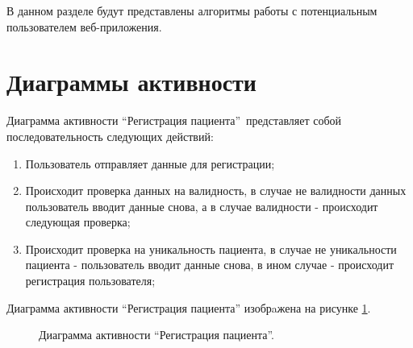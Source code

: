 \documentclass[14pt]{extreport}
\begin{document}
    В данном разделе будут представлены алгоритмы работы с потенциальным пользователем %
    веб-приложения.

    \section{Диаграммы активности}
        Диаграмма активности  “Регистрация пациента”\ представляет %
        собой последовательность следующих действий:
        \begin{enumerate}
            \item Пользователь отправляет данные для регистрации;
            \item Происходит проверка данных на валидность, в случае не %
            валидности данных пользователь вводит данные снова, а в %
            случае валидности - происходит следующая проверка;
            \item Происходит проверка на уникальность пациента, в %
            случае не уникальности пациента - пользователь вводит данные %
            снова, в ином случае - происходит регистрация пользователя;
        \end{enumerate}

        Диаграмма активности “Регистрация пациента” изобрaжена на рисунке \ref{diagram-registration}.
        \begin{figure}[H]%
            \centering
            \caption{Диаграмма активности “Регистрация пациента”.} \label{diagram-registration}
        \end{figure} 
\end{document}
